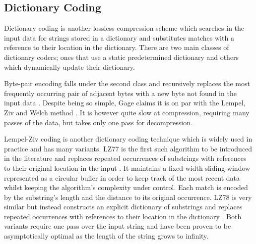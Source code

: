 
\subsection{Dictionary Coding}

Dictionary coding is another lossless compression scheme which searches in the input data for strings stored in a dictionary and substitutes matches with a reference to their location in the dictionary. There are two main classes of dictionary coders; ones that use a static predetermined dictionary and others which dynamically update their dictionary.

Byte-pair encoding falls under the second class and recursively replaces the most frequently occurring pair of adjacent bytes with a new byte not found in the input data \cite{byte-pair}. Despite being so simple, Gage claims it is on par with the Lempel, Ziv and Welch method \cite{lzw}. It is however quite slow at compression, requiring many passes of the data, but takes only one pass for decompression.

Lempel-Ziv coding is another dictionary coding technique which is widely used in practice and has many variants. LZ77 is the first such algorithm to be introduced in the literature and replaces repeated occurrences of substrings with references to their original location in the input \cite{lz77}. It maintains a fixed-width sliding window represented as a circular buffer in order to keep track of the most recent data whilst keeping the algorithm's complexity under control. Each match is encoded by the substring's length and the distance to its original occurrence. LZ78 is very similar but instead constructs an explicit dictionary of substrings and replaces repeated occurrences with references to their location in the dictionary \cite{lz78}. Both variants require one pass over the input string and have been proven to be asymptotically optimal as the length of the string grows to infinity.

